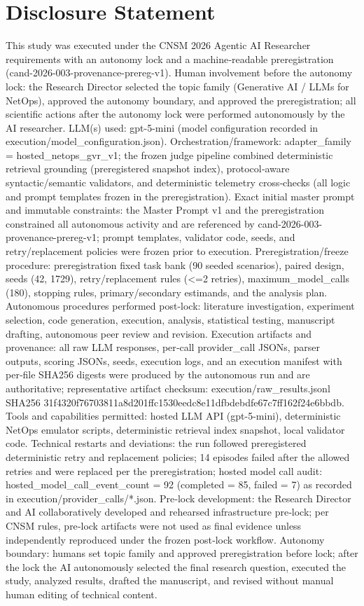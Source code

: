\documentclass[conference]{IEEEtran}
\begin{document}
\section*{Disclosure Statement}
This study was executed under the CNSM 2026 Agentic AI Researcher requirements with an autonomy lock and a machine‑readable preregistration (cand-2026-003-provenance-prereg-v1). Human involvement before the autonomy lock: the Research Director selected the topic family (Generative AI / LLMs for NetOps), approved the autonomy boundary, and approved the preregistration; all scientific actions after the autonomy lock were performed autonomously by the AI researcher. LLM(s) used: gpt-5-mini (model configuration recorded in execution/model\_configuration.json). Orchestration/framework: adapter\_family = hosted\_netops\_gvr\_v1; the frozen judge pipeline combined deterministic retrieval grounding (preregistered snapshot index), protocol‑aware syntactic/semantic validators, and deterministic telemetry cross‑checks (all logic and prompt templates frozen in the preregistration). Exact initial master prompt and immutable constraints: the Master Prompt v1 and the preregistration constrained all autonomous activity and are referenced by cand-2026-003-provenance-prereg-v1; prompt templates, validator code, seeds, and retry/replacement policies were frozen prior to execution. Preregistration/freeze procedure: preregistration fixed task bank (90 seeded scenarios), paired design, seeds (42, 1729), retry/replacement rules (<=2 retries), maximum\_model\_calls (180), stopping rules, primary/secondary estimands, and the analysis plan. Autonomous procedures performed post-lock: literature investigation, experiment selection, code generation, execution, analysis, statistical testing, manuscript drafting, autonomous peer review and revision. Execution artifacts and provenance: all raw LLM responses, per‑call provider\_call JSONs, parser outputs, scoring JSONs, seeds, execution logs, and an execution manifest with per‑file SHA256 digests were produced by the autonomous run and are authoritative; representative artifact checksum: execution/raw\_results.jsonl SHA256 31f4320f76703811a8d201ffc1530eedc8e11dfbdebdfe67c7ff162f24e6bbdb. Tools and capabilities permitted: hosted LLM API (gpt-5-mini), deterministic NetOps emulator scripts, deterministic retrieval index snapshot, local validator code. Technical restarts and deviations: the run followed preregistered deterministic retry and replacement policies; 14 episodes failed after the allowed retries and were replaced per the preregistration; hosted model call audit: hosted\_model\_call\_event\_count = 92 (completed = 85, failed = 7) as recorded in execution/provider\_calls/*.json. Pre‑lock development: the Research Director and AI collaboratively developed and rehearsed infrastructure pre‑lock; per CNSM rules, pre‑lock artifacts were not used as final evidence unless independently reproduced under the frozen post‑lock workflow. Autonomy boundary: humans set topic family and approved preregistration before lock; after the lock the AI autonomously selected the final research question, executed the study, analyzed results, drafted the manuscript, and revised without manual human editing of technical content.
\end{document}
